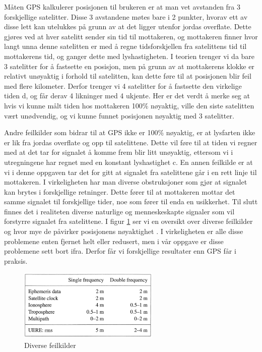\vspace{5mm}

Måten GPS kalkulerer posisjonen til brukeren er at man vet avstanden fra 3 forskjellige satelitter. Disse 3 avstandene møtes bare i 2 punkter, hvorav ett av disse lett kan utelukkes på grunn av at det ligger utenfor jordas overflate. Dette gjøres ved at hver satelitt sender sin tid til mottakeren, og mottakeren finner hvor langt unna denne satelitten er med å regne tidsforskjellen fra satelittens tid til mottakerens tid, og ganger dette med lyshastigheten. I teorien trenger vi da bare 3 satelitter for å fastsette en posisjon, men på grunn av at mottakerens klokke er relativt unøyaktig i forhold til satelitten, kan dette føre til at posisjonen blir feil med flere kilometer. Derfor trenger vi 4 satelitter for å fastsette den virkelige tiden d, og får derav 4 likninger med 4 ukjente. Her er det verdt å merke seg at hvis vi kunne målt tiden hos mottakeren 100\% nøyaktig, ville den siste satelitten vært unødvendig, og vi kunne funnet posisjonen nøyaktig med 3 satelitter. 

\vspace{5mm}

Andre feilkilder som bidrar til at GPS ikke er 100\% nøyaktig, er at lysfarten ikke er lik fra jordas overflate og opp til satelittene. Dette vil føre til at tiden vi regner med at det tar for signalet å komme frem blir litt unøyaktig, ettersom vi i utregningene har regnet med en konstant lyshastighet c. En annen feilkilde er at vi i denne oppgaven tar det for gitt at signalet fra satelittene går i en rett linje til mottakeren. I virkeligheten har man diverse obstruksjoner som gjør at signalet kan brytes i forskjellige retninger. Dette fører til at mottakeren mottar det samme signalet til forskjellige tider, noe som fører til enda en usikkerhet. Til slutt finnes det i realiteten diverse naturlige og menneskeskapte signaler som vil forstyrre signalet fra satelittene. I figur \ref{fig:errortable} ser vi en oversikt over diverse feilkilder og hvor mye de påvirker posisjonens nøyaktighet \cite{StrangBorre}. I virkeligheten er alle disse problemene enten fjernet helt eller redusert, men i vår oppgave er disse problemene sett bort ifra. Derfor får vi forskjellige resultater enn GPS får i praksis. 

\begin{figure}[h]
	\centering
	\includegraphics[width=0.60\textwidth]{sections/Conclusion/errortable.jpg}
	\caption{Diverse feilkilder}
	\label{fig:errortable}
\end{figure}